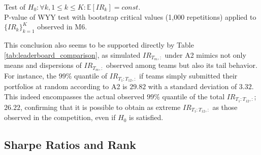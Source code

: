 \documentclass[3p,times,twocolumn]{elsarticle}
\begin{document}
\begin{table}[!htbp]
    \fontsize{5}{5}\selectfont
    \centering
    \caption{Test of $H_{0}:\forall k, 1\leq k\leq K: \mathbb{E}[IR_{k}]=const.$\\
        P-value of WYY test with bootstrap critical values (1,000 repetitions) applied to $\{IR_{k}\}_{k=1}^{K}$ observed in M6.
    }
    \label{tab:test_IR_pvalue_table}
\end{table}

This conclusion also seems to be supported directly by Table \ref{tab:leaderboard_comparison}, as simulated $IR_{T_{m},:}$ under A2 mimics not only means and dispersions of $IR_{T_{m},:}$ observed among teams but also its tail behavior.
For instance, the $99\%$ quantile of $IR_{T_{1}:T_{12},:}$ if teams simply submitted their portfolios at random according to A2 is $29.82$ with a standard deviation of $3.32$.
This indeed encompasses the actual observed $99\%$ quantile of the total $IR_{T_{1}:T_{12},:}$; $26.22$, confirming that it is possible to obtain as extreme $IR_{T_{1}:T_{12},:}$ as those observed in the competition, even if $H_{0}$ is satisfied.

\subsection{Sharpe Ratios and Rank}\label{subsection:IR_and_Rank}
\end{document}
